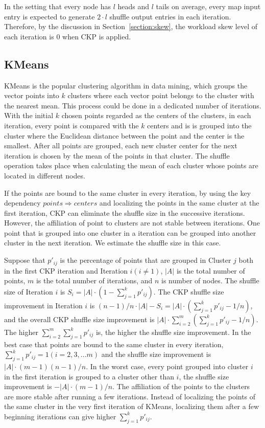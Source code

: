 \documentclass[10pt,journal,compsoc]{IEEEtran}
\begin{document}
In the setting that every node has $l$ heads and $l$ tails on average, every map input entry is expected to generate $2 \cdot l$ shuffle output entries in each iteration. Therefore, by the discussion in Section~\ref{section:skew}, the workload skew level of each iteration is 0 when CKP is applied. 

\subsection{KMeans}
KMeans \cite{kmeans} is the popular clustering algorithm in data mining, which groups the vector points into $k$ clusters where each vector point belongs to the cluster with the nearest mean. 
This process could be done in a dedicated number of iterations. 
With the initial $k$ chosen points regarded as the centers of the clusters, 
in each iteration, every point is compared with the $k$ centers and is is grouped into the cluster where the Euclidean distance between the point and the center is the smallest. 
After all points are grouped, each new cluster center for the next iteration is chosen by the mean of the points in that cluster. 
The shuffle operation takes place when calculating the mean of each cluster whose points are located in different nodes. 

If the points are bound to the same cluster in every iteration, 
by using the key dependency $points \Rightarrow centers$ 
and localizing the points in the same cluster at the first iteration, 
CKP can eliminate the shuffle size in the successive iterations. 
However, the affiliation of point to clusters are not stable between iterations. 
One point that is grouped into one cluster in a iteration can be grouped into another cluster in the next iteration. 
We estimate the shuffle size in this case. 

Suppose that $p'_{ij}$ is the percentage of points that are grouped in Cluster $j$ both in the first CKP iteration and Iteration $i (i \neq 1)$, 
$|A|$ is the total number of points, $m$ is the total number of iterations, 
and $n$ is number of nodes. 
The shuffle size of Iteration $i$ is $S_i=|A| \cdot (1-\sum_{j=1}^{k} p'_{ij})$.
The CKP shuffle size improvement in Iteration $i$ is 
$(n-1)/n \cdot |A| - S_i = |A| \cdot (\sum_{j=1}^{k} p'_{ij} - 1/n)$, 
and the overall CKP shuffle size improvement is $|A| \cdot \sum_{i=2}^{m} (\sum_{j=1}^{k} p'_{ij} - 1/n)$.
The higher $\sum_{i=2}^{m} \sum_{j=1}^{k} p'_{ij}$ is, the higher the shuffle size improvement. 
In the best case that points are bound to the same cluster in every iteration, 
$\sum_{j=1}^{k} p'_{ij}=1 (i=2,3,...m)$ 
and the shuffle size improvement is $|A| \cdot (m-1)(n-1)/n$.
In the worst case, every point grouped into cluster $i$ in the first iteration is grouped to a cluster other than $i$, the shuffle size improvement is 
$-|A|\cdot (m-1)/n$. 
The affiliation of the points to the clusters are more stable after running a few iterations. 
Instead of localizing the points of the same cluster in the very first iteration of KMeans, localizing them after a few beginning iterations can give higher $\sum_{j=1}^{k} p'_{ij}$.
\end{document}
